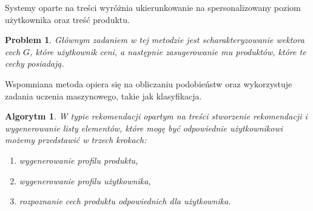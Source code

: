 \documentclass[12pt,a4paper]{report}
\newtheorem{algorytm}[df]{Algorytm}
\newtheorem{problem}{Problem}[chapter]
\begin{document}
Systemy oparte na treści wyróżnia ukierunkowanie na spersonalizowany poziom użytkownika oraz treść produktu. 
\begin{problem}
Głównym zadaniem w tej metodzie jest scharakteryzowanie wektora cech $G$, które użytkownik ceni, a następnie zasugerowanie mu produktów, które te cechy posiadają. 
\end{problem}

Wspomniana metoda opiera się na obliczaniu podobieństw oraz wykorzystuje zadania uczenia maszynowego, takie jak klasyfikacja.
\begin{algorytm}
W typie rekomendacji opartym na treści stworzenie rekomendacji i wygenerowanie listy elementów, które mogę być odpowiednie użytkownikowi możemy przedstawić w trzech krokach:
\begin{enumerate}
\item wygenerowanie profilu produktu,
\item wygenerowanie profilu użytkownika,
\item rozpoznanie cech produktu odpowiednich dla użytkownika.
\end{enumerate}
\end{algorytm}
\end{document}
